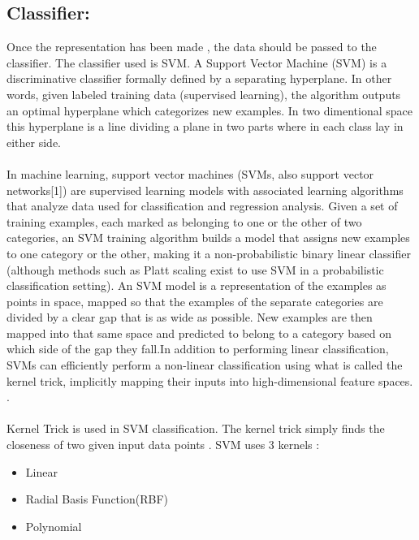 \subsection{Classifier:}
\indent 
Once the representation has been made , the data should  be passed to the classifier. The classifier used is SVM. A Support Vector Machine (SVM) is a discriminative classifier formally defined by a separating hyperplane. In other words, given labeled training data (supervised learning), the algorithm outputs an optimal hyperplane which categorizes new examples. In two dimentional space this hyperplane is a line dividing a plane in two parts where in each class lay in either side.
\paragraph{}
In machine learning, support vector machines (SVMs, also support vector networks[1]) are supervised learning models with associated learning algorithms that analyze data used for classification and regression analysis. Given a set of training examples, each marked as belonging to one or the other of two categories, an SVM training algorithm builds a model that assigns new examples to one category or the other, making it a non-probabilistic binary linear classifier (although methods such as Platt scaling exist to use SVM in a probabilistic classification setting). An SVM model is a representation of the examples as points in space, mapped so that the examples of the separate categories are divided by a clear gap that is as wide as possible. New examples are then mapped into that same space and predicted to belong to a category based on which side of the gap they fall.In addition to performing linear classification, SVMs can efficiently perform a non-linear classification using what is called the kernel trick, implicitly mapping their inputs into high-dimensional feature spaces.
.
\paragraph{}
Kernel Trick is used in SVM classification. The kernel trick simply finds the closeness of two given input data points .
SVM uses 3 kernels :
\begin{itemize}
	\item Linear
	\item Radial Basis Function(RBF)
	\item Polynomial
\end{itemize}

